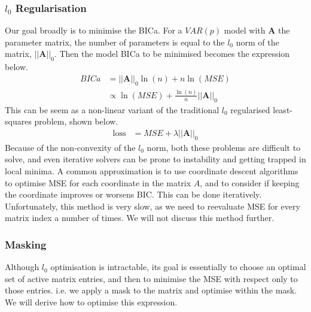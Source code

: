 \documentclass[12pt,a4paper]{article} %
\begin{document}
\subsubsection[l0 Regularisation]{$l_0$ Regularisation}
Our goal broadly is to minimise the BICa. For a $VAR(p)$ model with $\pmb{A}$ the parameter matrix, the number of parameters is equal to the $l_0$ norm of the matrix, $||\pmb{A}||_0$. Then the model BICa to be minimised becomes the expression below.
\begin{align*}
    BICa&=||\pmb{A}||_0\ln(n)+n\ln(MSE)\\
    &\propto\ln(MSE)+\frac{\ln(n)}{n}||\pmb{A}||_0
\end{align*}
This can be seem as a non-linear variant of the traditional $l_0$ regularised least-squares problem, shown below.
\begin{align*}
    \text{loss}&=MSE+\lambda||\pmb{A}||_0
\end{align*}
Because of the non-convexity of the $l_0$ norm, both these problems are difficult to solve, and even iterative solvers can be prone to instability and getting trapped in local minima. A common approximation is to use coordinate descent algorithms to optimise MSE for each coordinate in the matrix $A$, and to consider if keeping the coordinate improves or worsens BIC. This can be done iteratively. Unfortunately, this method is very slow, as we need to reevaluate MSE for every matrix index a number of times. We will not discuss this method further.
\subsubsection{Masking}
\label{subsec:masking}
Although $l_0$ optimisation is intractable, its goal is essentially to choose an optimal set of active matrix entries, and then to minimise the MSE with respect only to those entries. i.e. we apply a mask to the matrix and optimise within the mask. We will derive how to optimise this expression.
\end{document}

